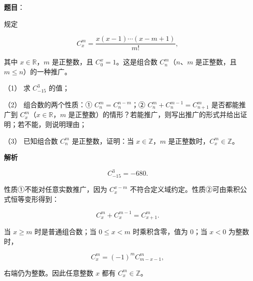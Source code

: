 \begin{answer}

\textbf{题目}：

规定

\nopagebreak[4]
\[
C_x^m=\frac{x(x-1)\cdots(x-m+1)}{m!},
\]

其中 $x\in\mathbb R$，$m$ 是正整数，且 $C_0^x=1$。这是组合数 $C_n^m$（$n\text{、}m$ 是正整数，且 $m\le n$）的一种推广。

（1） 求 $C_{-15}^3$ 的值；

（2） 组合数的两个性质：① $C_n^m=C_n^{n-m}$；② $C_n^m+C_n^{m-1}=C_{n+1}^m$ 是否都能推广到 $C_x^m$（$x\in\mathbb R$，$m$ 是正整数）的情形？若能推广，则写出推广的形式并给出证明；若不能，则说明理由；

（3） 已知组合数 $C_n^m$ 是正整数，证明：当 $x\in\mathbb Z$，$m$ 是正整数时，$C_x^m\in\mathbb Z$。

\textbf{解析}


\nopagebreak[4]
\[
C_{-15}^3=-680.
\]


性质①不能对任意实数推广，因为 $C_x^{x-m}$ 不符合定义域约定。性质②可由乘积公式恒等变形得到：

\nopagebreak[4]
\[
C_x^m+C_x^{m-1}=C_{x+1}^m.
\]


当 $x\ge m$ 时是普通组合数；当 $0\le x<m$ 时乘积含零，值为 0；当 $x<0$ 为整数时，

\nopagebreak[4]
\[
C_x^m=(-1)^mC_{m-x-1}^m,
\]

右端仍为整数。因此任意整数 $x$ 都有 $C_x^m\in\mathbb Z$。




\end{answer}